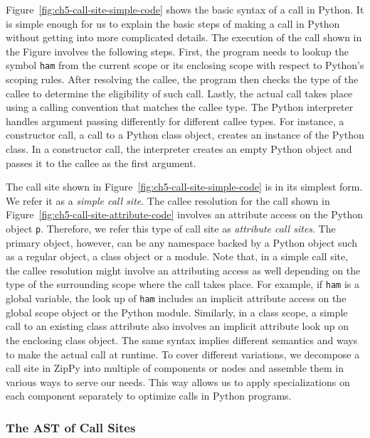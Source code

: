 Figure~\ref{fig:ch5-call-site-simple-code} shows the basic syntax of a call in Python.
It is simple enough for us to explain the basic steps of making a call in Python without getting into more complicated details.
The execution of the call shown in the Figure involves the following steps.
First, the program needs to lookup the symbol \texttt{ham} from the current scope or its enclosing scope with respect to Python's scoping rules.
After resolving the callee, the program then checks the type of the callee to determine the eligibility of such call.
Lastly, the actual call takes place using a calling convention that matches the callee type.
The Python interpreter handles argument passing differently for different callee types.
For instance, a constructor call, a call to a Python class object, creates an instance of the Python class.
In a constructor call, the interpreter creates an empty Python object and passes it to the callee as the first argument.

The call site shown in Figure~\ref{fig:ch5-call-site-simple-code} is in its simplest form.
We refer it as a \emph{simple call site}.
The callee resolution for the call shown in Figure~\ref{fig:ch5-call-site-attribute-code} involves an attribute access on the Python object \texttt{p}.
Therefore, we refer this type of call site as \emph{attribute call sites}.
The primary object, however, can be any namespace backed by a Python object such as a regular object, a class object or a module.
Note that, in a simple call site, the callee resolution might involve an attributing access as well depending on the type of the surrounding scope where the call takes place.
For example, if \texttt{ham} is a global variable, the look up of \texttt{ham} includes an implicit attribute access on the global scope object or the Python module.
Similarly, in a class scope, a simple call to an existing class attribute also involves an implicit attribute look up on the enclosing class object.
The same syntax implies different semantics and ways to make the actual call at runtime.
To cover different variations, we decompose a call site in ZipPy into multiple of components or nodes and assemble them in various ways to serve our needs.
This way allows us to apply specializations on each component separately to optimize calls in Python programs.

\subsubsection{The AST of Call Sites}

